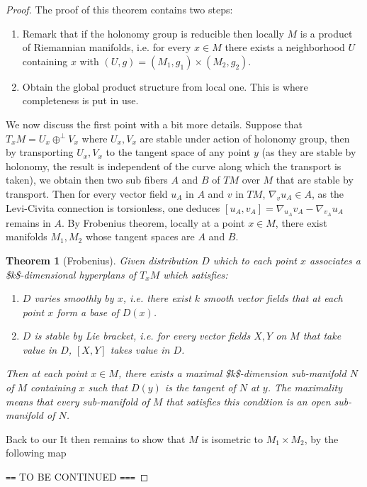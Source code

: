\documentclass[11pt]{article}
\newtheorem{theorem}{Theorem}
\begin{document}
\begin{proof}
The proof of this theorem contains two steps:
\begin{enumerate}
\item Remark that if the holonomy group is reducible then locally \(M\) is a product of Riemannian
manifolds, i.e. for every \(x\in M\) there exists a neighborhood \(U\) containing \(x\) with
\((U,g)=(M_1,g_1)\times (M_2,g_2)\).
\item Obtain the global product structure from local one. This is where completeness is put in use.
\end{enumerate}


We now discuss the first point with a bit more details. Suppose that \(T_xM = U_x \oplus^\perp V_x\)
where \(U_x, V_x\) are stable under action of holonomy group, then by transporting \(U_x, V_x\) to the
tangent space of any point \(y\) (as they are stable by holonomy, the result is independent of the
curve along which the transport is taken), we obtain then two sub fibers \(A\) and \(B\) of \(TM\) over
\(M\) that are stable by transport. Then for every vector field \(u_A\) in \(A\) and \(v\) in \(TM\),
\(\nabla_v u_A \in A\), as the Levi-Civita connection is torsionless, one deduces
\([u_A,v_A] = \nabla_{u_A}v_A - \nabla_{v_A}u_A\) remains in \(A\). By Frobenius theorem, locally at a
point \(x\in M\), there exist manifolds \(M_1, M_2\) whose tangent spaces are \(A\) and \(B\). 


\begin{theorem}[Frobenius]
\label{thm:Frobenius}
\label{org7e97a60}
Given distribution \(D\) which to each point \(x\) associates a \$k\$-dimensional hyperplans of \(T_xM\)
which satisfies:
\begin{enumerate}
\item \(D\) varies smoothly by \(x\), i.e. there exist \(k\) smooth vector fields that at each point \(x\)
form a base of \(D(x)\).
\item \(D\) is stable by Lie bracket, i.e. for every vector fields \(X,Y\) on \(M\) that take value in \(D\),
\([X,Y]\) takes value in \(D\).
\end{enumerate}
Then at each point \(x\in M\), there exists a maximal \$k\$-dimension sub-manifold \(N\) of \(M\) containing
\(x\) such that \(D(y)\) is the tangent of \(N\) at \(y\). The maximality means that every sub-manifold of
\(M\) that satisfies this condition is an open sub-manifold of \(N\).
\end{theorem}

Back to our It then remains to show that \(M\) is isometric to \(M_1\times M_2\), by the following map

\texttt{==} TO BE CONTINUED \texttt{===}
\end{proof}
\end{document}
